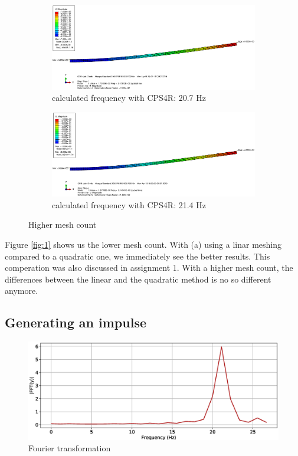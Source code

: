 \documentclass[12pt]{article}
\begin{document}
\begin{figure}[!htb]
  \centering
  \begin{subfigure}{.5\textwidth}
    \centering
    \includegraphics[width=0.95\linewidth]{pics/Beam_1_CPS4R_L}
    \caption{calculated frequency with CPS4R: 20.7 Hz}
  \end{subfigure}%
  \begin{subfigure}{.5\textwidth}
    \centering
    \includegraphics[width=0.95\linewidth]{pics/Beam_1_CPS8R_L}
    \caption{calculated frequency with CPS4R: 21.4 Hz}
   \end{subfigure}
  \caption{Higher mesh count}
  \label{fig:2}
\end{figure}

\noindent Figure \ref{fig:1} shows us the lower mesh count. With (a) using a linar meshing compared to a quadratic one,
we immediately see the better results. This comperation was also discussed in assignment 1. With a higher mesh count,
the differences between the linear and the quadratic method is no so different anymore.
\newpage
\subsection{Generating an impulse}

\begin{figure}[!htb]
  \centering
  \includegraphics[width=0.95\linewidth]{pics/Report2}
  \caption{Fourier transformation}
\end{figure}
\end{document}
